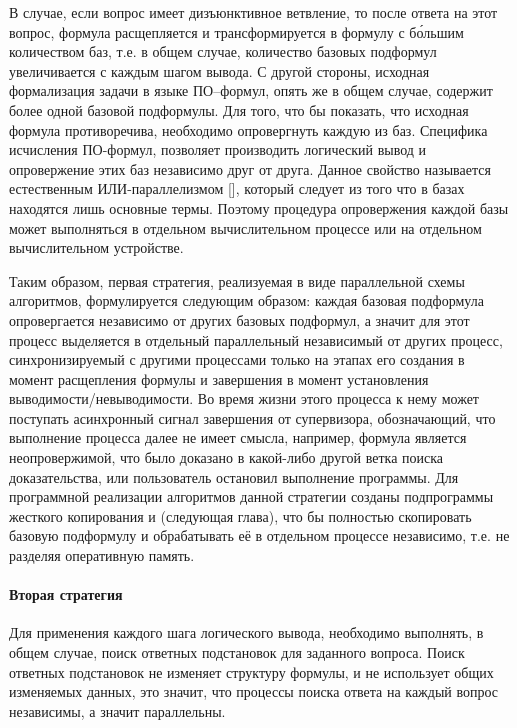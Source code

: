 В случае, если вопрос имеет дизъюнктивное ветвление, то после ответа на этот вопрос, формула расщепляется и трансформируется в формулу с б\'{о}льшим количеством баз, т.е. в общем случае, количество базовых подформул увеличивается с каждым шагом вывода. С другой стороны, исходная формализация задачи в языке ПО--формул, опять же в общем случае, содержит более одной базовой подформулы. Для того, что бы показать, что исходная формула противоречива, необходимо опровергнуть каждую из баз. Специфика исчисления ПО-формул, позволяет производить логический вывод и опровержение этих баз независимо друг от друга. Данное свойство называется естественным ИЛИ-параллелизмом [], который следует из того что в базах находятся лишь основные термы. Поэтому процедура опровержения каждой базы может выполняться в отдельном вычислительном процессе или на отдельном вычислительном устройстве.

Таким образом, первая стратегия, реализуемая в виде параллельной схемы алгоритмов, формулируется следующим образом: каждая базовая подформула  опровергается независимо от других базовых подформул, а значит для этот процесс выделяется в отдельный параллельный независимый от других процесс, синхронизируемый с другими процессами только  на этапах его создания в момент расщепления формулы и завершения в момент установления выводимости/невыводимости. Во время жизни этого процесса к нему может поступать асинхронный сигнал завершения от супервизора, обозначающий, что выполнение процесса далее не имеет смысла, например, формула является неопровержимой, что было доказано в какой-либо другой ветка поиска доказательства, или пользователь остановил выполнение программы. Для программной реализации алгоритмов данной стратегии созданы подпрограммы жесткого копирования и  (следующая глава), что бы полностью скопировать базовую подформулу и обрабатывать её в отдельном процессе независимо, т.е. не разделяя оперативную память.


\paragraph{Вторая стратегия}
Для применения каждого шага логического вывода, необходимо выполнять, в общем случае, поиск ответных подстановок для заданного вопроса. Поиск ответных подстановок не изменяет структуру формулы, и не использует общих изменяемых данных, это значит, что процессы поиска ответа на каждый вопрос независимы, а значит параллельны. 


